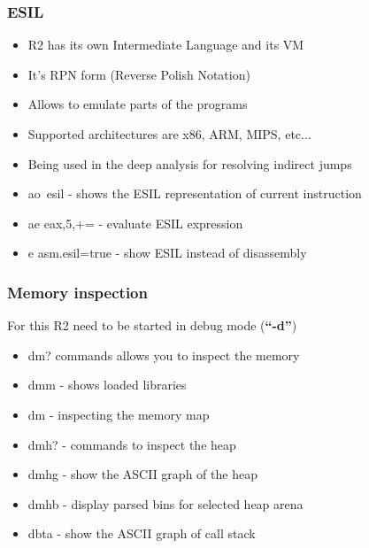 \documentclass[10pt,pdf,utf8,english,compress,hyperref={unicode}]{beamer}
\begin{document}
\begin{frame}[fragile]
  \frametitle{ESIL}
  \begin{itemize}
	  \item R2 has its own Intermediate Language and its VM
	  \item It's RPN form (Reverse Polish Notation)
	  \item Allows to emulate parts of the programs
	  \item Supported architectures are x86, ARM, MIPS, etc...
	  \item Being used in the deep analysis for resolving indirect jumps
	  \item \alert{ao~esil} - shows the ESIL representation of current instruction
	  \item \alert{ae eax,5,+=} - evaluate ESIL expression
	  \item \alert{e asm.esil=true} - show ESIL instead of disassembly
  \end{itemize}
\end{frame}


\begin{frame}[fragile]
  \frametitle{Memory inspection}
  For this R2 need to be started in debug mode (\textbf{``-d''})
  \begin{itemize}
	  \item \alert{dm?} commands allows you to inspect the memory
	  \item \alert{dmm} - shows loaded libraries
	  \item \alert{dm} - inspecting the memory map
	  \item \alert{dmh?} - commands to inspect the heap
	  \item \alert{dmhg} - show the ASCII graph of the heap
	  \item \alert{dmhb} - display parsed bins for selected heap arena
	  \item \alert{dbta} - show the ASCII graph of call stack
  \end{itemize}
\end{frame}
\end{document}
